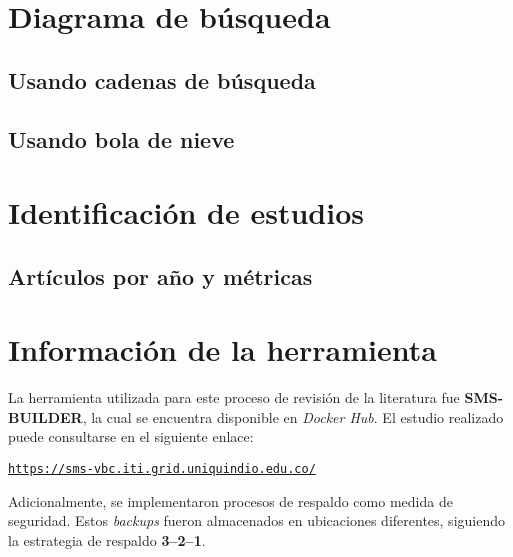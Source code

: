 \section{Diagrama de búsqueda}\label{sec:diagramaBusqueda}

\subsection{Usando cadenas de búsqueda}


\subsection{Usando bola de nieve}


\section{Identificación de estudios}

\subsection{Artículos por año y métricas}


\section{Información de la herramienta}

\noindent
La herramienta utilizada para este proceso de revisión de la literatura fue \textbf{SMS-BUILDER}, la cual se encuentra disponible en \textit{Docker Hub}. El estudio realizado puede consultarse en el siguiente enlace:

\begin{center}
\href{https://sms-vbc.iti.grid.uniquindio.edu.co/}{\texttt{https://sms-vbc.iti.grid.uniquindio.edu.co/}}
\end{center}

\noindent
Adicionalmente, se implementaron procesos de respaldo como medida de seguridad. Estos \textit{backups} fueron almacenados en ubicaciones diferentes, siguiendo la estrategia de respaldo \textbf{3--2--1}.
